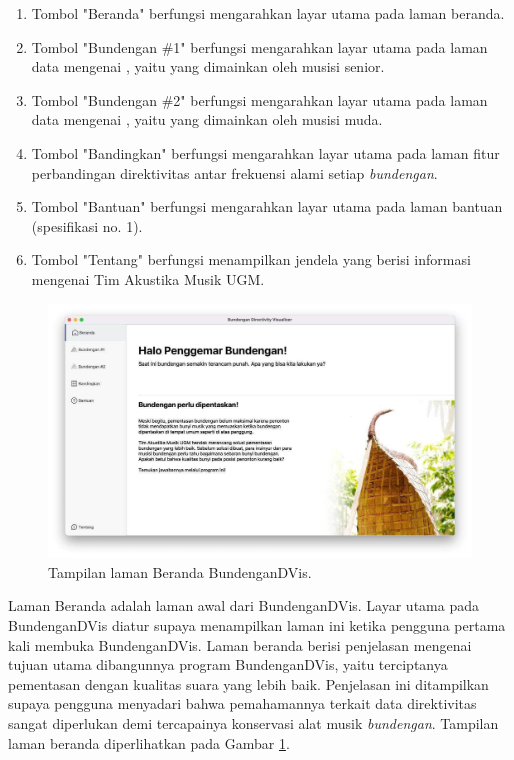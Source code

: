\begin{enumerate}
	\item Tombol "Beranda" berfungsi mengarahkan layar utama pada laman beranda.
	\item Tombol "Bundengan \#1" berfungsi mengarahkan layar utama pada laman data mengenai , yaitu \bundengan yang dimainkan oleh musisi senior.
	\item Tombol "Bundengan \#2" berfungsi mengarahkan layar utama pada laman data mengenai , yaitu \bundengan yang dimainkan oleh musisi muda.
	\item Tombol "Bandingkan" berfungsi mengarahkan layar utama pada laman fitur perbandingan direktivitas antar frekuensi alami setiap \emph{bundengan}.
	\item Tombol "Bantuan" berfungsi mengarahkan layar utama pada laman bantuan (spesifikasi no. 1).
	\item Tombol "Tentang" berfungsi menampilkan jendela yang berisi informasi mengenai Tim Akustika Musik UGM.
\end{enumerate}

\begin{figure}[h!]
	\centering
	\includegraphics[width=13cm]{Gambar/laman-beranda.jpg}
	\caption{Tampilan laman Beranda BundenganDVis.}
	\label{fig:home-app}
\end{figure}

Laman Beranda adalah laman awal dari BundenganDVis. Layar utama pada BundenganDVis diatur supaya menampilkan laman ini ketika pengguna pertama kali membuka BundenganDVis. Laman beranda berisi penjelasan mengenai tujuan utama dibangunnya program BundenganDVis, yaitu terciptanya pementasan \bundengan dengan kualitas suara yang lebih baik. Penjelasan ini ditampilkan supaya pengguna menyadari bahwa pemahamannya terkait data direktivitas \bundengan sangat diperlukan demi tercapainya konservasi alat musik \emph{bundengan}. Tampilan laman beranda diperlihatkan pada Gambar \ref{fig:home-app}. \par 


